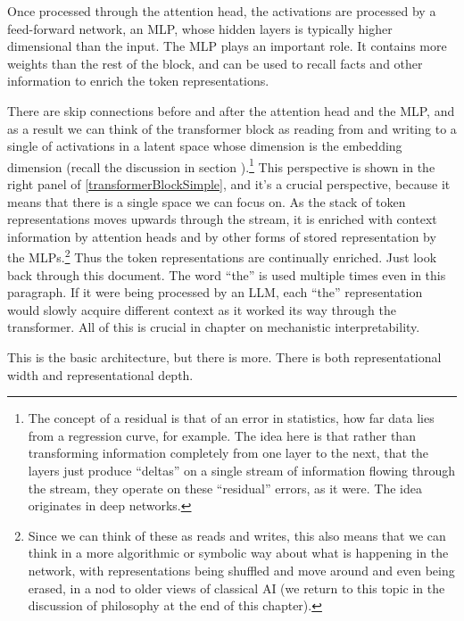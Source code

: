 Once processed through the attention head, the activations are processed by a
feed-forward network, an MLP, whose hidden layers is typically higher
dimensional than the input.	The MLP plays an important role. It contains more
weights than the rest of the block, and can be used to recall facts and other
information to enrich the token representations. 

There are skip connections before and after the attention head and the MLP, and
as a result we can think of the transformer block as reading from and writing
to a single  of activations in a latent space
\cite{elhage2021mathematical, milliere2024philosophical2} whose dimension is
the embedding dimension (recall the discussion in section
).\footnote{The concept of a residual is that of an error
in statistics, how far data lies from a regression curve, for example. The idea
here is that rather than transforming information completely from one layer to
the next, that the layers just produce ``deltas'' on a single stream of
information flowing through the stream, they operate on these ``residual''
errors, as it were. The idea originates in deep networks.}  This perspective is
shown in the right panel of \ref{transformerBlockSimple}, and it's a crucial
perspective, because it means that there is a single space we can focus on. As
the stack of token representations moves upwards through the stream, it is
enriched with context information by attention heads and by other forms of
stored representation by the MLPs.\footnote{Since we can think of these as
reads and writes, this also means that we can think in a more algorithmic or
symbolic way about what is happening in the network, with representations being
shuffled and move around and even being erased, in a nod to older views of
classical AI (we return to this topic in the discussion of philosophy at the
end of this chapter).}  Thus the token representations are continually
enriched. Just look back through this document. The word ``the'' is used
multiple times even in this paragraph. If it were being processed by an LLM,
each ``the'' representation would slowly acquire different context as it worked
its way through the transformer. All of this is crucial in chapter
 on mechanistic interpretability. 

This is the basic architecture, but there is more. There is both
representational width and representational depth.
 
